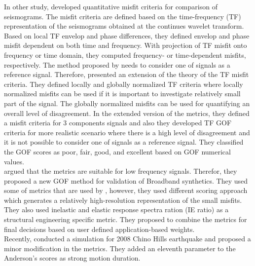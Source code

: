 In other study, \citet{Kristekova_2006_BSSA} developed quantitative misfit criteria for comparison of seismograms. The misfit criteria are defined based on the time-frequency (TF) representation of the seismograms obtained at the continues wavelet transform. Based on local TF envelop and phase differences, they defined envelop and phase misfit dependent on both time and frequency. With projection of TF misfit onto frequency or time domain, they computed frequency- or time-dependent misfits, respectively. The method proposed  by \citet{Kristekova_2006_BSSA} needs to consider one of signals as a reference signal. Therefore, \citet{Kristekova_2009_GJI} presented an extension of the theory of the TF misfit criteria. They defined locally and globally normalized TF criteria where locally normalized misfits can be used if it is important to investigate relatively small part of the signal. The globally normalized misfits can be used for quantifying an overall level of disagreement. In the extended version of the metrics, they defined a misfit criteria for 3 components signals and also they developed TF GOF criteria for more realistic scenario where there is a high level of disagreement and it is not possible to consider one of signals as a reference signal. They classified the GOF scores as poor, fair, good, and excellent based on GOF numerical values.\\

\citet{Olsen_2010_SRL} argued that the \citet{Kristekova_2006_BSSA,Kristekova_2009_GJI}  metrics are suitable for low frequency signals. Therefor, they proposed a new GOF method for validation of Broadband synthetics. They used some of metrics that are used by \citet{Anderson_2004_Proc}, however, they used different scoring approach which generates a relatively high-resolution representation of the small misfits. They also used inelastic and elastic response spectra ration (IE ratio) as a structural engineering specific metric. They proposed to combine the metrics for final decisions based on user defined application-based weights.\\

Recently, \citet{Taborda_2013_BSSA} conducted a simulation for 2008 Chino Hills earthquake and proposed a minor modification in the \citet{Anderson_2004_Proc} metrics. They added an eleventh parameter to the Anderson's scores as strong motion duration.\\

